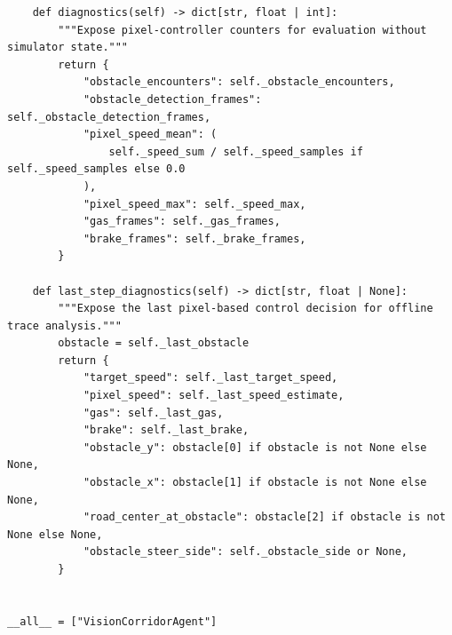 \documentclass[11pt,a4paper]{article}
\begin{document}
\begin{lstlisting}
    def diagnostics(self) -> dict[str, float | int]:
        """Expose pixel-controller counters for evaluation without simulator state."""
        return {
            "obstacle_encounters": self._obstacle_encounters,
            "obstacle_detection_frames": self._obstacle_detection_frames,
            "pixel_speed_mean": (
                self._speed_sum / self._speed_samples if self._speed_samples else 0.0
            ),
            "pixel_speed_max": self._speed_max,
            "gas_frames": self._gas_frames,
            "brake_frames": self._brake_frames,
        }

    def last_step_diagnostics(self) -> dict[str, float | None]:
        """Expose the last pixel-based control decision for offline trace analysis."""
        obstacle = self._last_obstacle
        return {
            "target_speed": self._last_target_speed,
            "pixel_speed": self._last_speed_estimate,
            "gas": self._last_gas,
            "brake": self._last_brake,
            "obstacle_y": obstacle[0] if obstacle is not None else None,
            "obstacle_x": obstacle[1] if obstacle is not None else None,
            "road_center_at_obstacle": obstacle[2] if obstacle is not None else None,
            "obstacle_steer_side": self._obstacle_side or None,
        }


__all__ = ["VisionCorridorAgent"]

\end{lstlisting}

\clearpage
\end{document}

